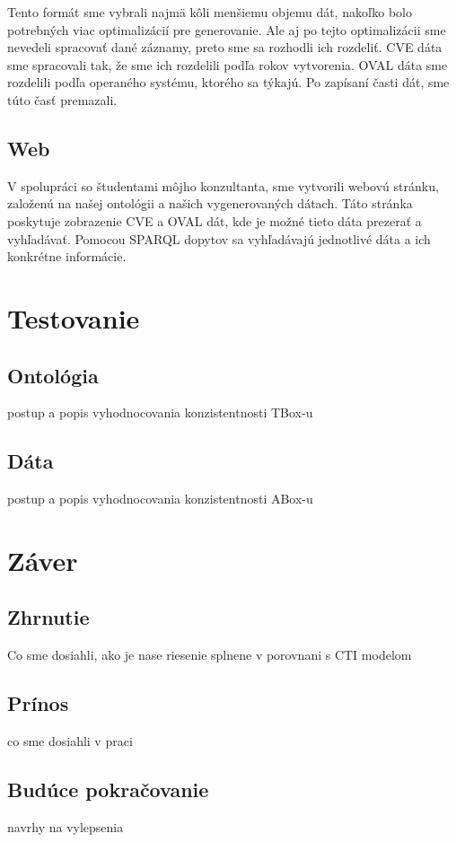 \documentclass[12pt, a4paper, oneside]{book}
\begin{document}
Tento formát sme vybrali najmä kôli menšiemu objemu dát, nakoľko bolo potrebných viac optimalizácií pre generovanie. Ale aj po tejto optimalizácii sme nevedeli spracovať dané záznamy, preto sme sa  rozhodli ich rozdeliť. CVE dáta sme spracovali tak, že sme ich rozdelili podľa rokov vytvorenia. OVAL dáta sme rozdelili podľa operaného systému, ktorého sa týkajú. Po zapísaní časti dát, sme túto časť premazali.


\section{Web}
V spolupráci so študentami môjho konzultanta, sme vytvorili webovú stránku, založenú na našej ontológii a našich vygenerovaných dátach. Táto stránka poskytuje zobrazenie CVE a OVAL dát, kde je možné tieto dáta prezerať a vyhľadávať. Pomocou SPARQL dopytov sa vyhľadávajú jednotlivé dáta a ich konkrétne informácie.

\chapter{Testovanie}
\section{Ontológia}
postup a popis vyhodnocovania konzistentnosti TBox-u

\section{Dáta}
postup a popis vyhodnocovania konzistentnosti ABox-u


\chapter{Záver}
\section{Zhrnutie}
Co sme dosiahli, ako je nase riesenie splnene v porovnani s CTI modelom


\section{Prínos}
co sme dosiahli v praci


\section{Budúce pokračovanie}
navrhy na vylepsenia

\nocite{*}



\listoffigures
\end{document}
